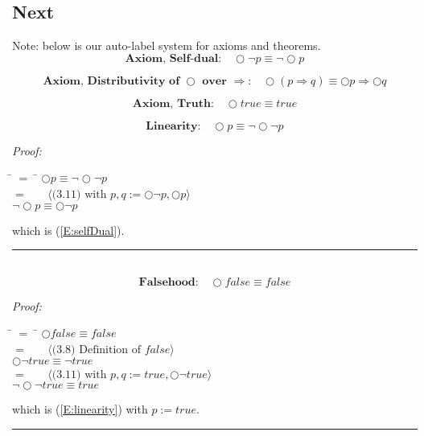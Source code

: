 \documentclass[fleqn, leqno]{article}
\newcommand{\lgap}{2pt}                             %
\newcommand{\mymathindent}{24pt}                      %
\newcommand{\Next}{\bigcirc}
\newcommand{\myqed}{\hfill\rule[-.23ex]{1.2ex}{2.0ex}}
\newcommand{\Gll} {\langle}                         %
\newcommand{\Ggg} {\rangle}                         %
\newcommand{\Hint}[1]     {\ \ \ $\Gll              \mbox{#1} \Ggg$ }   %
\begin{document}
\subsection{Next}

Note: below is our auto-label system for axioms and theorems.\\

\begin{equation}\label{E:selfDual}
\textbf{Axiom, Self-dual:}\quad \Next\lnot p \equiv \lnot\Next p
\end{equation}

\begin{equation}\label{E:distNextImp}
\textbf{Axiom, Distributivity of $\Next$ over $\Rightarrow$:}\quad \Next (p \Rightarrow q) \equiv \Next p \Rightarrow \Next q
\end{equation}

\begin{equation}\label{E:nextTruth}
\textbf{Axiom, Truth:}\quad \Next true \equiv true
\end{equation}

\begin{equation}\label{E:linearity}
\textbf{Linearity:}\quad \Next p \equiv \lnot\Next\lnot p
\end{equation}

\emph{Proof:}
\begin{tabbing}
\hspace{\mymathindent} \= $= \;$ \= \kill
  \> \>   $\Next p \equiv \lnot\Next\lnot p$\\[\lgap]
  \> $=$  \>  \Hint{(3.11) with $p,q := \Next\lnot p, \Next p$} \\[\lgap]
  \> \>   $\lnot\Next p \equiv \Next\lnot p$
\end{tabbing}
which is (\ref{E:selfDual}). \myqed\\[\lgap]


\begin{equation}\label{E:nextFalse}
\textbf{Falsehood:}\quad \Next false \equiv false
\end{equation}

\emph{Proof:}
\begin{tabbing}
\hspace{\mymathindent} \= $= \;$ \= \kill
  \> \>   $\Next false \equiv false$\\[\lgap]
  \> $=$  \>  \Hint{(3.8) Definition of $false$} \\[\lgap]
  \> \>   $\Next\lnot true \equiv \lnot true$\\[\lgap]
  \> $=$  \>  \Hint{(3.11) with $p,q := true, \Next\lnot true$}\\[\lgap]
  \> \>   $\lnot\Next\lnot true \equiv true$\\[\lgap]
\end{tabbing}
which is (\ref{E:linearity}) with $p := true$. \myqed\\[\lgap]
\end{document}
